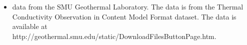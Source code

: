 \begin{itemize}
\item data from the SMU Geothermal Laboratory. The data is from the Thermal Conductivity Observation in Content Model Format dataset. The data is available at http://geothermal.smu.edu/static/DownloadFilesButtonPage.htm.
\end{itemize}
